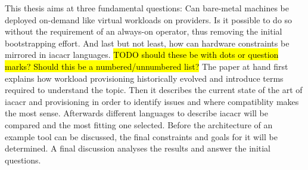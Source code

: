 \newline
This thesis aims at three fundamental questions: Can bare-metal machines be deployed on-demand like virtual workloads on providers. Is it possible to do so without the requirement of an always-on operator, thus removing the initial bootstrapping effort. And last but not least, how can hardware constraints be mirrored in \gls{iacacr} languages.
\hl{TODO should these be with dots or question marks? Should this be a numbered/unnumbered list?}
\newline
The paper at hand first explains how workload provisioning historically evolved and introduce terms required to understand the topic. Then it describes the current state of the art of \gls{iacacr} and provisioning in order to identify issues and where compatiblity makes the most sense. Afterwards different languages to describe \gls{iacacr} will be compared and the most fitting one selected.
Before the architecture of an example tool can be discussed, the final constraints and goals for it will be determined. A final discussion analyses the results and answer the initial questions.
